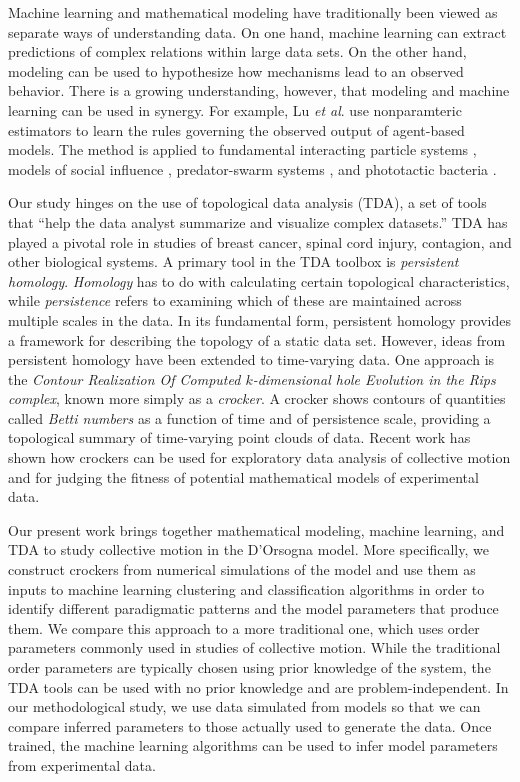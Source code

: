 \documentclass[%
 aip,
reprint,
 amsmath,amssymb,
 aps,
showkeys
]{revtex4-1}
\begin{document}
Machine learning and mathematical modeling have traditionally been viewed as separate ways of understanding data. On one hand, machine learning can extract predictions of complex relations within large data sets. On the other hand, modeling can be used to hypothesize how mechanisms lead to an observed behavior. There is a growing understanding, however, that modeling and machine learning can be used in synergy. \cite{BakPenJay2018} For example, Lu \emph{et al}. use nonparamteric estimators to learn the rules governing the observed output of agent-based models.\cite{lu_nonparametric_2019} The method is applied to fundamental interacting particle systems \cite{jones_determination_1924}, models of social influence \cite{couzin_effective_2005}, predator-swarm systems \cite{chen_minimal_2014}, and phototactic bacteria \cite{ha_particle_2009}.

Our study hinges on the use of topological data analysis (TDA), a set of tools that ``help the data analyst summarize and visualize complex datasets.''\cite{Was2018} TDA has played a pivotal role in studies of breast cancer, spinal cord injury, contagion, and other biological systems. \cite{NicLevCar2011,NiePaqLiu2015,TayKliHar2015} A primary tool in the TDA toolbox is \emph{persistent homology}. \emph{Homology} has to do with calculating certain topological characteristics, while \emph{persistence} refers to examining which of these are maintained across multiple scales in the data. In its fundamental form, persistent homology provides a framework for describing the topology of a static data set. However, ideas from persistent homology have been extended to time-varying data. One approach is the \emph{Contour Realization Of Computed $k$-dimensional hole Evolution in the Rips complex}, known more simply as a \emph{crocker}. \cite{TopZieHal2015} A crocker shows contours of quantities called \emph{Betti numbers} as a function of time and of persistence scale, providing a topological summary of time-varying point clouds of data. Recent work has shown how crockers can be used for exploratory data analysis of collective motion and for judging the fitness of potential mathematical models of experimental data. \cite{TopZieHal2015,UlmZieTop2019}

Our present work brings together mathematical modeling, machine learning, and TDA to study collective motion in the D'Orsogna model. More specifically, we construct crockers from numerical simulations of the model and use them as inputs to machine learning clustering and classification algorithms in order to identify different paradigmatic patterns and the model parameters that produce them. We compare this approach to a more traditional one, which uses order parameters commonly used in studies of collective motion. While the traditional order parameters are typically chosen using prior knowledge of the system, the TDA tools can be used with no prior knowledge and are problem-independent. In our methodological study, we use data simulated from models so that we can compare inferred parameters to those actually used to generate the data. Once trained, the machine learning algorithms can be used to infer model parameters from experimental data.
\end{document}

